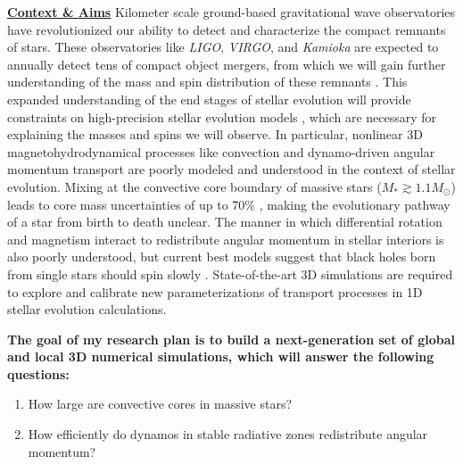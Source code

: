 \documentclass[12pt]{article}
\newcommand{\sct}[1]{\vspace{0.3cm}\hspace{-\parindent}\textbf{\underline{#1}}\hspace{0.3cm}}
\begin{document}
\thispagestyle{fancy}

\sct{Context \& Aims}
Kilometer scale ground-based gravitational wave observatories have revolutionized our ability to detect and characterize the compact remnants of stars.
These observatories like \emph{LIGO}, \emph{VIRGO}, and \emph{Kamioka} are expected to annually detect tens of compact object mergers, from which we will gain further understanding of the mass and spin distribution of these remnants \citep{roulet_etal_2021}.
This expanded understanding of the end stages of stellar evolution will provide constraints on high-precision stellar evolution models \citep{mesa6}, which are necessary for explaining the masses and spins we will observe.
In particular, nonlinear 3D magnetohydrodynamical processes like convection and dynamo-driven angular momentum transport are poorly modeled and understood in the context of stellar evolution.
Mixing at the convective core boundary of massive stars ($M_* \gtrsim 1.1 M_\odot$) leads to core mass uncertainties of up to 70\% \citep{kaiser_etal_2020}, making the evolutionary pathway of a star from birth to death unclear.
The manner in which differential rotation and magnetism interact to redistribute angular momentum in stellar interiors is also poorly understood, but current best models suggest that black holes born from single stars should spin slowly \citep{fuller_ma_2019}.
State-of-the-art 3D simulations are required to explore and calibrate new parameterizations of transport processes in 1D stellar evolution calculations.

\textbf{The goal of my research plan is to build a next-generation set of global and local 3D numerical simulations, which will answer the following questions:}\vspace{-0.2cm}
\begin{enumerate}
    \item How large are convective cores in massive stars? \vspace{-0.2cm}
    \item How efficiently do dynamos in stable radiative zones redistribute angular momentum?
\end{enumerate}
\end{document}

